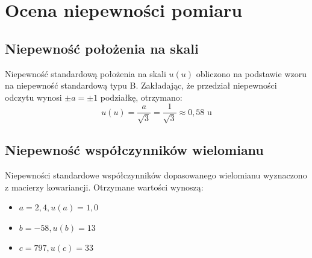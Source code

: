 \documentclass[a4paper,12pt]{article}
\begin{document}
\section{Ocena niepewności pomiaru}

\subsection{Niepewność położenia na skali}
Niepewność standardową położenia na skali $u(u)$ obliczono na podstawie wzoru na niepewność standardową typu B. Zakładając, że przedział niepewności odczytu wynosi $\pm a = \pm 1$ podziałkę, otrzymano:
\begin{equation*}
    u(u) = \frac{a}{\sqrt{3}} = \frac{1}{\sqrt{3}} \approx 0{,}58 \text{ u}
\end{equation*}


\subsection{Niepewność współczynników wielomianu}

Niepewności standardowe współczynników dopasowanego wielomianu wyznaczono z macierzy kowariancji. Otrzymane wartości wynoszą:

\begin{itemize}
    \item $a = 2{,}4, u(a) = 1{,}0$
    \item $b = -58, u(b) = 13$
    \item $c = 797, u(c) = 33$
\end{itemize}
\end{document}
